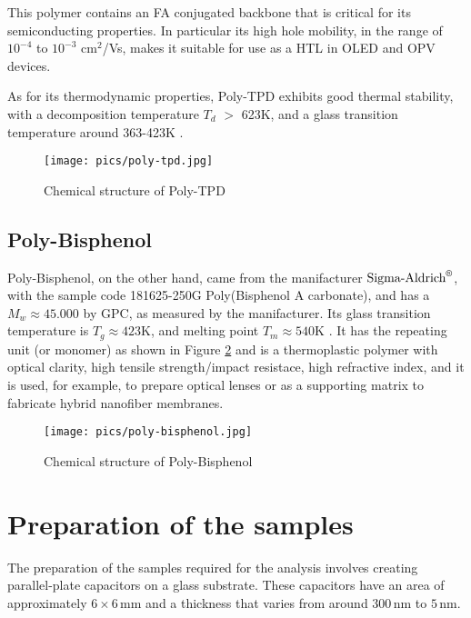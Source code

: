 This polymer contains an FA conjugated backbone that is critical for its semiconducting properties. In particular its high hole mobility, in the range of $10^{-4}$ to $10^{-3}$ cm$^2$/Vs, makes it suitable for use as a \ac{HTL} in \ac{OLED} and \ac{OPV} devices.

As for its thermodynamic properties, Poly-TPD exhibits good thermal stability, with a decomposition temperature $T_d$ $>$ 623K, and a glass transition temperature around 363-423K \cite{KIM2017167}.


\begin{figure}[htp!]
    \centering
    \hspace*{-0.8cm}
    \texttt{[image: pics/poly-tpd.jpg]}
    \caption{Chemical structure of Poly-TPD}
    \label{ptpid}
\end{figure}

\subsection{Poly-Bisphenol}
Poly-Bisphenol, on the other hand, came from the manifacturer $\text{Sigma-Aldrich}^{\text{\textregistered}}$, with the sample code 181625-250G Poly(Bisphenol A carbonate), and has a $M_w \approx 45.000$ by \ac{GPC}, as measured by the manifacturer. Its glass transition temperature is $T_g \approx 423 \text{K}$, and melting point $T_m \approx 540 \text{K}$ \cite{yin2012}.
It has the repeating unit (or monomer) as shown in Figure \ref{pbis} and is a thermoplastic polymer with optical clarity, high tensile strength/impact resistace, high refractive index, and it is used, for example, to prepare optical lenses or as a supporting matrix to fabricate hybrid nanofiber membranes.

\begin{figure}[htp!]
    \centering
    \hspace*{-0.8cm}
    \texttt{[image: pics/poly-bisphenol.jpg]}
    \caption{Chemical structure of Poly-Bisphenol}
    \label{pbis}
\end{figure}



%
\section{Preparation of the samples}

The preparation of the samples required for the analysis involves creating parallel-plate capacitors on a glass substrate. These capacitors have an area of approximately \( 6 \times 6 \, \text{mm} \) and a thickness that varies from around \( 300 \, \text{nm} \) to \( 5 \, \text{nm} \).

